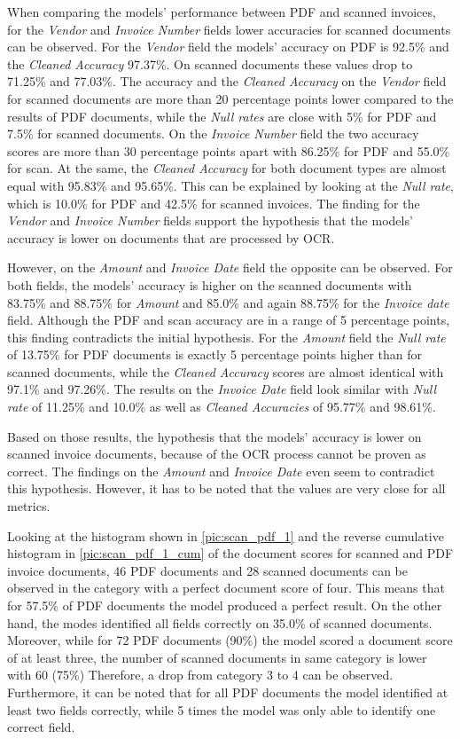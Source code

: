 When comparing the models' performance between PDF and scanned invoices, for the \textit{Vendor} and \textit{Invoice Number} fields lower accuracies for scanned documents can be observed. For the \textit{Vendor} field the models' accuracy on PDF is 92.5\% and the \textit{Cleaned Accuracy} 97.37\%. On scanned documents these values drop to 71.25\% and 77.03\%. The accuracy and the \textit{Cleaned Accuracy} on the \textit{Vendor} field for scanned documents are more than 20 percentage points lower compared to the results of PDF documents, while the \textit{Null rates} are close with 5\% for PDF and 7.5\% for scanned documents. On the \textit{Invoice Number} field the two accuracy scores are more than 30 percentage points apart with 86.25\% for PDF and 55.0\% for scan. At the same, the \textit{Cleaned Accuracy} for both document types are almost equal with 95.83\% and 95.65\%. This can be explained by looking at the \textit{Null rate}, which is 10.0\% for PDF and 42.5\% for scanned invoices. The finding for the \textit{Vendor} and \textit{Invoice Number} fields support the hypothesis that the models' accuracy is lower on documents that are processed by \ac{OCR}.

However, on the \textit{Amount} and \textit{Invoice Date} field the opposite can be observed. For both fields, the models' accuracy is higher on the scanned documents  with 83.75\% and 88.75\% for \textit{Amount} and 85.0\% and again 88.75\% for the \textit{Invoice date} field. Although the PDF and scan accuracy are in a range of 5 percentage points, this finding contradicts the initial hypothesis. For the \textit{Amount} field the \textit{Null rate} of 13.75\% for PDF documents is exactly 5 percentage points higher than for scanned documents, while the \textit{Cleaned Accuracy} scores are almost identical with 97.1\% and 97.26\%. The results on the \textit{Invoice Date} field look similar with \textit{Null rate} of 11.25\% and 10.0\% as well as \textit{Cleaned Accuracies} of 95.77\% and 98.61\%.

Based on those results, the hypothesis that the models' accuracy is lower on scanned invoice documents, because of the \ac{OCR} process cannot be proven as correct. The findings on the \textit{Amount} and \textit{Invoice Date} even seem to contradict this hypothesis. However, it has to be noted that the values are very close for all metrics.

Looking at the histogram shown in \cref{pic:scan_pdf_1} and the reverse cumulative histogram in \cref{pic:scan_pdf_1_cum} of the document scores for scanned and PDF invoice documents, 46 PDF documents and 28 scanned documents can be observed in the category with a perfect document score of four. This means that for 57.5\% of PDF documents the model produced a perfect result. On the other hand, the modes identified all fields correctly on 35.0\% of scanned documents. 
Moreover, while for 72 PDF documents (90\%) the model scored a document score of at least three, the number of scanned documents in same category is lower with 60 (75\%)
Therefore, a drop from category 3 to 4 can be observed.
Furthermore, it can be noted that for all PDF documents the model identified at least two fields correctly, while 5 times the model was only able to identify one correct field. 

